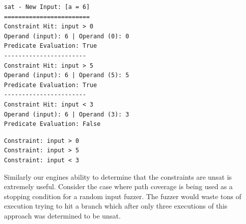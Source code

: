\begin{lstlisting}[caption={System Output - Final Iteration}, label=snip:step3]
sat - New Input: [a = 6]
========================
Constraint Hit: input > 0
Operand (input): 6 | Operand (0): 0
Predicate Evaluation: True
-----------------------
Constraint Hit: input > 5
Operand (input): 6 | Operand (5): 5
Predicate Evaluation: True
-----------------------
Constraint Hit: input < 3
Operand (input): 6 | Operand (3): 3
Predicate Evaluation: False
\end{lstlisting}

\vspace{-0.6cm}

\begin{lstlisting}[caption={System Output - Static Analysis}, label=snip:static]
Constraint: input > 0
Constraint: input > 5
Constraint: input < 3
\end{lstlisting}

Similarly our engines ability to determine that the constraints are unsat is extremely useful. Consider the case where path coverage is being used as a stopping condition for a random input fuzzer. The fuzzer would waste tons of execution trying to hit a branch which after only three executions of this approach was determined to be unsat.